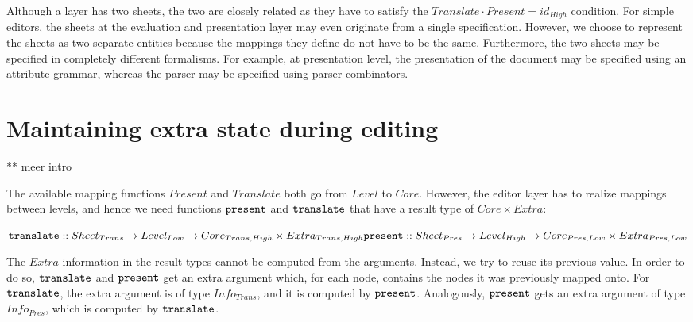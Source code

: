 Although a layer has two sheets, the two are closely related as they have to satisfy the
$Translate \cdot Present = id_{High}$ condition. For simple editors, the sheets at the evaluation and presentation layer may even originate from a single specification. However, we choose to represent the sheets as two separate entities because the mappings they define do not have to be the same.  Furthermore, the two sheets may be specified in completely different formalisms. For example, at presentation level, the presentation of the document may be specified using an attribute grammar, whereas the parser may be specified using parser combinators.






%																
%																
%																
\section{Maintaining extra state during editing} \label{sect:maintainingExtraState}

** meer intro


The available mapping functions $Present$ and $Translate$ both go from $Level$ to $Core$. However, the editor layer has to realize mappings between levels, and hence we need functions ${\tt present}$ and ${\tt translate}$ that have a result type of $Core \times Extra$:

\begin{math}
{\tt translate} :: Sheet_{Trans} \rightarrow Level_{Low} \rightarrow Core_{Trans,High}  \times Extra_{Trans,High} \\
{\tt present} :: Sheet_{Pres} \rightarrow Level_{High} \rightarrow Core_{Pres,Low} \times Extra_{Pres,Low} \\
\end{math}

The $Extra$ information in the result types cannot be computed from the arguments. Instead, we try to reuse its previous value. In order to do so, ${\tt translate}$ and ${\tt present}$ get an extra argument which, for each node, contains the nodes it was previously mapped onto. For ${\tt translate}$, the extra argument is of type $Info_{Trans}$, and it is computed by ${\tt present}$. Analogously, ${\tt present}$ gets an extra argument of type $Info_{Pres}$, which is computed by ${\tt translate}$. 


